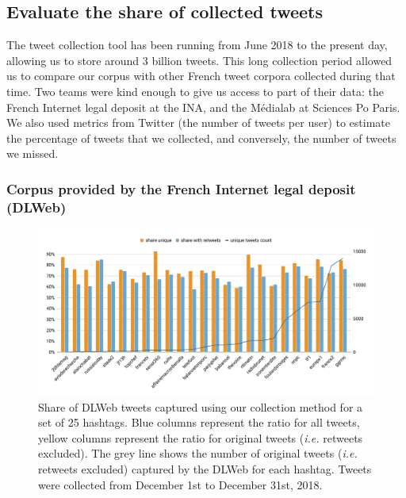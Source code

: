 \subsection{Evaluate the share of collected tweets}
\label{Evaluate the share}
The tweet collection tool has been running from June 2018 to the present day, allowing us to store around 3 billion tweets. This long collection period allowed us to compare our corpus with other French tweet corpora collected during that time. Two teams were kind enough to give us access to part of their data: the French Internet legal deposit at the INA, and the Médialab at Sciences Po Paris. We also used metrics from Twitter (the number of tweets per user) to estimate the percentage of tweets that we collected, and conversely, the number of tweets we missed.

\subsubsection{Corpus provided by the French Internet legal deposit (DLWeb)}
\begin{figure}
\begin{center}
\includegraphics[width=1\textwidth]{figures/ShareinCommonWithDL.pdf}
\end{center}

\caption[Share of DLWeb tweets captured using our collection method for a set of 25 hashtags.]{Share of DLWeb tweets captured using our collection method for a set of 25 hashtags. Blue columns represent the ratio for all tweets, yellow columns represent the ratio for original tweets (\textit{i.e.} retweets excluded). The grey line shows the number of original tweets (\textit{i.e.} retweets excluded) captured by the DLWeb for each hashtag. Tweets were collected from December 1st to December 31st, 2018.}
\label{Figure:HistogramHashtagsDLWeb}
\end{figure}

